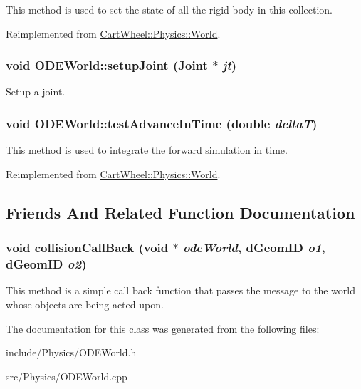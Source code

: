 This method is used to set the state of all the rigid body in this collection. 

Reimplemented from \hyperlink{classCartWheel_1_1Physics_1_1World_a8dd0eefe9170b86b0bca968851db88f5}{CartWheel::Physics::World}.

\hypertarget{classCartWheel_1_1Physics_1_1ODEWorld_ae1fb3953c58a1fe62e1ecc2ca4d7c68e}{
\subsubsection[{setupJoint}]{\setlength{\rightskip}{0pt plus 5cm}void ODEWorld::setupJoint ({\bf Joint} $\ast$ {\em jt})}}
\label{classCartWheel_1_1Physics_1_1ODEWorld_ae1fb3953c58a1fe62e1ecc2ca4d7c68e}
Setup a joint. \hypertarget{classCartWheel_1_1Physics_1_1ODEWorld_a3989f16bd09d91d2ebf773567ac39e6d}{
\subsubsection[{testAdvanceInTime}]{\setlength{\rightskip}{0pt plus 5cm}void ODEWorld::testAdvanceInTime (double {\em deltaT})}}
\label{classCartWheel_1_1Physics_1_1ODEWorld_a3989f16bd09d91d2ebf773567ac39e6d}
This method is used to integrate the forward simulation in time. 

Reimplemented from \hyperlink{classCartWheel_1_1Physics_1_1World_a3eb9011c4c08c2183c1d9a37042e126a}{CartWheel::Physics::World}.



\subsection{Friends And Related Function Documentation}
\hypertarget{classCartWheel_1_1Physics_1_1ODEWorld_a0119980a84afa8b21900e6df9a269913}{
\subsubsection[{collisionCallBack}]{\setlength{\rightskip}{0pt plus 5cm}void collisionCallBack (void $\ast$ {\em odeWorld}, \/  dGeomID {\em o1}, \/  dGeomID {\em o2})}}
\label{classCartWheel_1_1Physics_1_1ODEWorld_a0119980a84afa8b21900e6df9a269913}
This method is a simple call back function that passes the message to the world whose objects are being acted upon. 

The documentation for this class was generated from the following files:\begin{DoxyCompactItemize}
\item 
include/Physics/ODEWorld.h\item 
src/Physics/ODEWorld.cpp\end{DoxyCompactItemize}
